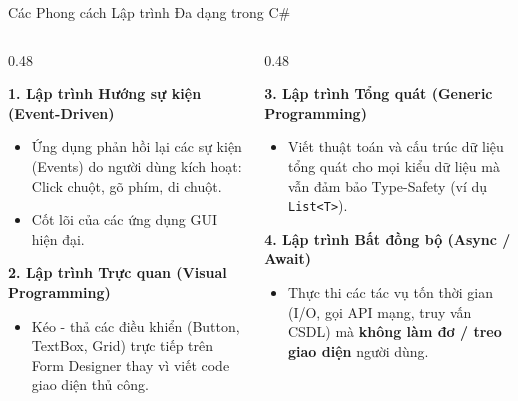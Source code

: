\documentclass[aspectratio=169, 10pt]{beamer}
\begin{document}
\begin{frame}{Các Phong cách Lập trình Đa dạng trong C\#}
  \begin{columns}[T]
    \begin{column}{0.48\textwidth}
      \begin{block}{\textbf{1. Lập trình Hướng sự kiện (Event-Driven)}}
        \begin{itemize}
          \item Ứng dụng phản hồi lại các sự kiện (Events) do người dùng kích hoạt: Click chuột, gõ phím, di chuột.
          \item Cốt lõi của các ứng dụng GUI hiện đại.
        \end{itemize}
      \end{block}
      \begin{block}{\textbf{2. Lập trình Trực quan (Visual Programming)}}
        \begin{itemize}
          \item Kéo - thả các điều khiển (Button, TextBox, Grid) trực tiếp trên Form Designer thay vì viết code giao diện thủ công.
        \end{itemize}
      \end{block}
    \end{column}
    \begin{column}{0.48\textwidth}
      \begin{block}{\textbf{3. Lập trình Tổng quát (Generic Programming)}}
        \begin{itemize}
          \item Viết thuật toán và cấu trúc dữ liệu tổng quát cho mọi kiểu dữ liệu mà vẫn đảm bảo Type-Safety (ví dụ \texttt{List<T>}).
        \end{itemize}
      \end{block}
      \begin{block}{\textbf{4. Lập trình Bất đồng bộ (Async / Await)}}
        \begin{itemize}
          \item Thực thi các tác vụ tốn thời gian (I/O, gọi API mạng, truy vấn CSDL) mà \textbf{không làm đơ / treo giao diện} người dùng.
        \end{itemize}
      \end{block}
    \end{column}
  \end{columns}
\end{frame}
\end{document}
